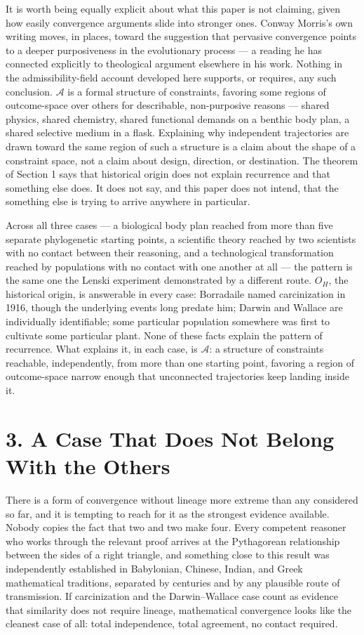 \documentclass[11pt]{article}
\theoremstyle{plain}
\begin{document}
It is worth being equally explicit about what this paper is not claiming, given how easily convergence arguments slide into stronger ones. Conway Morris's own writing moves, in places, toward the suggestion that pervasive convergence points to a deeper purposiveness in the evolutionary process --- a reading he has connected explicitly to theological argument elsewhere in his work. Nothing in the admissibility-field account developed here supports, or requires, any such conclusion. \(\mathcal{A}\) is a formal structure of constraints, favoring some regions of outcome-space over others for describable, non-purposive reasons --- shared physics, shared chemistry, shared functional demands on a benthic body plan, a shared selective medium in a flask. Explaining why independent trajectories are drawn toward the same region of such a structure is a claim about the shape of a constraint space, not a claim about design, direction, or destination. The theorem of Section 1 says that historical origin does not explain recurrence and that something else does. It does not say, and this paper does not intend, that the something else is trying to arrive anywhere in particular.

Across all three cases --- a biological body plan reached from more than five separate phylogenetic starting points, a scientific theory reached by two scientists with no contact between their reasoning, and a technological transformation reached by populations with no contact with one another at all --- the pattern is the same one the Lenski experiment demonstrated by a different route. \(O_H\), the historical origin, is answerable in every case: Borradaile named carcinization in 1916, though the underlying events long predate him; Darwin and Wallace are individually identifiable; some particular population somewhere was first to cultivate some particular plant. None of these facts explain the pattern of recurrence. What explains it, in each case, is \(\mathcal{A}\): a structure of constraints reachable, independently, from more than one starting point, favoring a region of outcome-space narrow enough that unconnected trajectories keep landing inside it.

\section*{3. A Case That Does Not Belong With the Others}

There is a form of convergence without lineage more extreme than any considered so far, and it is tempting to reach for it as the strongest evidence available. Nobody copies the fact that two and two make four. Every competent reasoner who works through the relevant proof arrives at the Pythagorean relationship between the sides of a right triangle, and something close to this result was independently established in Babylonian, Chinese, Indian, and Greek mathematical traditions, separated by centuries and by any plausible route of transmission. If carcinization and the Darwin--Wallace case count as evidence that similarity does not require lineage, mathematical convergence looks like the cleanest case of all: total independence, total agreement, no contact required.
\end{document}
